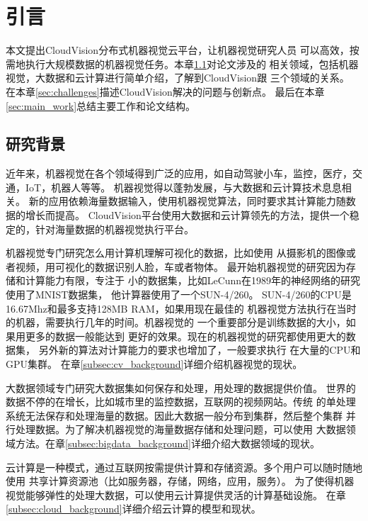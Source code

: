 \chapter{引言}
\label{cha:intro}
本文提出CloudVision分布式机器视觉云平台，让机器视觉研究人员
可以高效，按需地执行大规模数据的机器视觉任务。本章\ref{sec:background}对论文涉及的
相关领域，包括机器视觉，大数据和云计算进行简单介绍，了解到CloudVision跟
三个领域的关系。
在本章\ref{sec:challenges}描述CloudVision解决的问题与创新点。
最后在本章\ref{sec:main_work}总结主要工作和论文结构。

\section{研究背景}
\label{sec:background}
近年来，机器视觉在各个领域得到广泛的应用，如自动驾驶小车，监控，医疗，交通，IoT，机器人等等。
机器视觉得以蓬勃发展，与大数据和云计算技术息息相关。
新的应用依赖海量数据输入，使用机器视觉算法，同时要求其计算能力随数据的增长而提高。
CloudVision平台使用大数据和云计算领先的方法，提供一个稳定的，针对海量数据的机器视觉执行平台。

机器视觉专门研究怎么用计算机理解可视化的数据，比如使用
从摄影机的图像或者视频，用可视化的数据识别人脸，车或者物体。
最开始机器视觉的研究因为存储和计算能力有限，专注于
小的数据集，比如LeCunn在1989年的神经网络的研究使用了MNIST数据集，
他计算器使用了一个SUN-4/260。\cite{lecun1989backpropagation}
SUN-4/260的CPU是16.67Mhz和最多支持128MB RAM，如果用现在最佳的
机器视觉方法执行在当时的机器，需要执行几年的时间。机器视觉的
一个重要部分是训练数据的大小，如果用更多的数据一般能达到
更好的效果。现在的机器视觉的研究都使用更大的数据集，
另外新的算法对计算能力的要求也增加了，一般要求执行
在大量的CPU和GPU集群。\cite{googlenet2015,baidup2015deepgpu}
在章\ref{subsec:cv_background}详细介绍机器视觉的现状。

大数据领域专门研究大数据集如何保存和处理，用处理的数据提供价值。
世界的数据不停的在增长，比如城市里的监控数据，互联网的视频网站。传统
的单处理系统无法保存和处理海量的数据。因此大数据一般分布到集群，然后整个集群
并行处理数据。为了解决机器视觉的海量数据存储和处理问题，可以使用
大数据领域方法。在章\ref{subsec:bigdata_background}详细介绍大数据领域的现状。

云计算是一种模式，通过互联网按需提供计算和存储资源。多个用户可以随时随地使用
共享计算资源池（比如服务器，存储，网络，应用，服务）。
为了使得机器视觉能够弹性的处理大数据，可以使用云计算提供灵活的计算基础设施。
在章\ref{subsec:cloud_background}详细介绍云计算的模型和现状。




